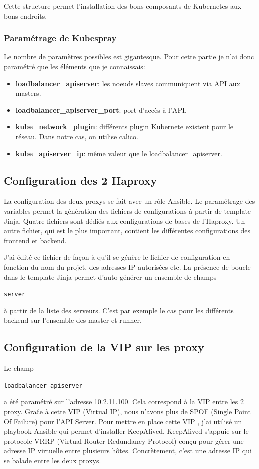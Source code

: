 \documentclass[12pt, a4paper, twoside]{article}
\begin{document}
Cette structure permet l'installation des bons composants de \gls{Kubernetes} aux bons endroits.

\subsubsection{Paramétrage de Kubespray}
Le nombre de paramètres possibles est gigantesque.
Pour cette partie je n'ai donc paramétré que les éléments que je connaissais:
\begin{itemize}
    \item \textbf{loadbalancer\_apiserver}: les noeuds slaves communiquent via \gls{API} aux masters.
    \item \textbf{loadbalancer\_apiserver\_port}: port d'accès à l'\gls{API}.
    \item \textbf{kube\_network\_plugin}: différents plugin Kubernete existent pour le réseau.
    Dans notre cas, on utilise calico.
    \item \textbf{kube\_apiserver\_ip}: même valeur que le loadbalancer\_apiserver.
\end{itemize}

\subsection{Configuration des 2 Haproxy}
La configuration des deux proxys se fait avec un rôle \gls{Ansible}.
Le paramétrage des variables permet la génération des fichiers de configurations à partir de template \gls{Jinja}.
Quatre fichiers sont dédiés aux configurations de bases de l'Haproxy.
Un autre fichier, qui est le plus important, contient les différentes configurations des frontend et backend.

J'ai édité ce fichier de façon à qu'il se génère le fichier de configuration en fonction du nom du projet, des adresses \gls{IP} autorisées etc.
La présence de boucle dans le template \gls{Jinja} permet d'auto-générer un ensemble de champs \begin{code}\texttt{server}\end{code} à partir de la liste des serveurs.
C'est par exemple le cas pour les différents backend sur l'ensemble des master et runner.

\subsection{Configuration de la VIP sur les proxy}
Le champ \begin{code}\texttt{loadbalancer\_apiserver}\end{code} a été paramétré sur l'adresse 10.2.11.100.
Cela correspond à la \gls{VIP} entre les 2 proxy.
Graĉe à cette \gls{VIP}  (Virtual \gls{IP}), nous n'avons plus de SPOF (Single Point Of Failure) pour l'\gls{API} Server.
Pour mettre en place cette \gls{VIP} , j'ai utilisé un playbook \gls{Ansible} qui permet d'installer KeepAlived.
KeepAlived s'appuie sur le protocole VRRP (Virtual Router Redundancy Protocol) conçu pour gérer une adresse \gls{IP} virtuelle entre plusieurs hôtes.
Concrètement, c'est une adresse \gls{IP} qui se balade entre les deux proxys.
\end{document}
